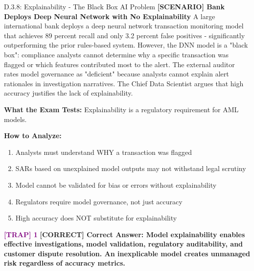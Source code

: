 \documentclass[11pt,a4paper]{beamer}
\newcommand{\trap}[1]{\textcolor{purple}{\textbf{[TRAP] 1}}}
\newcommand{\correct}[1]{\textcolor{green!50!black}{\textbf{[CORRECT] #1}}}
\newcommand{\scenario}[1]{\textcolor{blue!70!black}{\textbf{[SCENARIO] #1}}}
\begin{document}
\begin{frame}{D.3.8: Explainability - The Black Box AI Problem}
	\scenario{Bank Deploys Deep Neural Network with No Explainability}
	A large international bank deploys a deep neural network transaction monitoring model that achieves 89 percent recall and only 3.2 percent false positives - significantly outperforming the prior rules-based system. However, the DNN model is a "black box": compliance analysts cannot determine why a specific transaction was flagged or which features contributed most to the alert. The external auditor rates model governance as "deficient" because analysts cannot explain alert rationales in investigation narratives. The Chief Data Scientist argues that high accuracy justifies the lack of explainability.
	
	\vspace{0.1cm}
	\textbf{What the Exam Tests:} Explainability is a regulatory requirement for AML models.
	
	\vspace{0.1cm}
	\textbf{How to Analyze:}
	\begin{enumerate}
		\item Analysts must understand WHY a transaction was flagged
		\item SARs based on unexplained model outputs may not withstand legal scrutiny
		\item Model cannot be validated for bias or errors without explainability
		\item Regulators require model governance, not just accuracy
		\item High accuracy does NOT substitute for explainability
	\end{enumerate}
	
	\trap{Common Distractor: "Under the risk-based approach, accuracy is paramount; explainability is secondary."}
	\correct{Correct Answer: Model explainability enables effective investigations, model validation, regulatory auditability, and customer dispute resolution. An inexplicable model creates unmanaged risk regardless of accuracy metrics.}
\end{frame}
\end{document}
